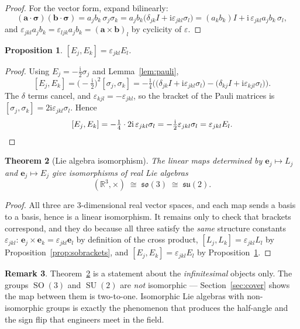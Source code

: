 \documentclass[11pt]{article}
\DeclareMathOperator{\SO}{SO}
\DeclareMathOperator{\SU}{SU}
\newcommand{\so}{\mathfrak{so}}
\newcommand{\su}{\mathfrak{su}}
\newcommand{\R}{\mathbb{R}}
\newcommand{\vv}[1]{\bm{#1}}
\newcommand{\ii}{\mathrm{i}}
\theoremstyle{plain}
\newtheorem{theorem}{Theorem}[section]
\newtheorem{proposition}[theorem]{Proposition}
\theoremstyle{definition}
\newtheorem{remark}[theorem]{Remark}
\begin{document}
\begin{proof}
For the vector form, expand bilinearly:
\[
(\vv a\cdot\vv\sigma)(\vv b\cdot\vv\sigma)=a_jb_k\,\sigma_j\sigma_k
=a_jb_k\big(\delta_{jk}I+\ii\varepsilon_{jkl}\sigma_l\big)
=(a_kb_k)I+\ii\,\varepsilon_{jkl}a_jb_k\,\sigma_l ,
\]
and $\varepsilon_{jkl}a_jb_k=\varepsilon_{ljk}a_jb_k=(\vv a\times\vv b)_l$ by cyclicity of
$\varepsilon$.
\end{proof}

\begin{proposition}\label{prop:subrackets}
$[E_j,E_k]=\varepsilon_{jkl}E_l$.
\end{proposition}

\begin{proof}
Using $E_j=-\tfrac{\ii}{2}\sigma_j$ and Lemma~\ref{lem:pauli},
\[
[E_j,E_k]=\Big(-\tfrac{\ii}{2}\Big)^{\!2}[\sigma_j,\sigma_k]
=-\tfrac14\Big(\big(\delta_{jk}I+\ii\varepsilon_{jkl}\sigma_l\big)
-\big(\delta_{kj}I+\ii\varepsilon_{kjl}\sigma_l\big)\Big).
\]
The $\delta$ terms cancel, and $\varepsilon_{kjl}=-\varepsilon_{jkl}$, so the bracket of the Pauli
matrices is $[\sigma_j,\sigma_k]=2\ii\varepsilon_{jkl}\sigma_l$. Hence
\[
[E_j,E_k]=-\tfrac14\cdot 2\ii\,\varepsilon_{jkl}\sigma_l
=-\tfrac{\ii}{2}\varepsilon_{jkl}\sigma_l=\varepsilon_{jkl}E_l . \qedhere
\]
\end{proof}

\begin{theorem}[Lie algebra isomorphism]\label{thm:algiso}
The linear maps determined by $\vv e_j\mapsto L_j$ and $\vv e_j\mapsto E_j$ give isomorphisms of
real Lie algebras
\[
(\R^3,\times)\;\cong\;\so(3)\;\cong\;\su(2).
\]
\end{theorem}

\begin{proof}
All three are $3$-dimensional real vector spaces, and each map sends a basis to a basis, hence is a
linear isomorphism. It remains only to check that brackets correspond, and they do because all
three satisfy the \emph{same} structure constants $\varepsilon_{jkl}$:
$\vv e_j\times\vv e_k=\varepsilon_{jkl}\vv e_l$ by definition of the cross product,
$[L_j,L_k]=\varepsilon_{jkl}L_l$ by Proposition~\ref{prop:sobrackets}, and
$[E_j,E_k]=\varepsilon_{jkl}E_l$ by Proposition~\ref{prop:subrackets}.
\end{proof}

\begin{remark}
Theorem~\ref{thm:algiso} is a statement about the \emph{infinitesimal} objects only. The groups
$\SO(3)$ and $\SU(2)$ are \emph{not} isomorphic --- Section~\ref{sec:cover} shows the map between
them is two-to-one. Isomorphic Lie algebras with non-isomorphic groups is exactly the phenomenon
that produces the half-angle and the sign flip that engineers meet in the field.
\end{remark}
\end{document}
